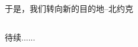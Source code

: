 ﻿\documentclass[hyperref={bookmarks=true},xcolor=pdflatex,svgnames,table,compress]{beamer}
\begin{document}
\subsection{}
\begin{frame}
\begin{ztebox}
于是，我们转向新的目的地--北约克
\end{ztebox}
\end{frame}

\subsection{}
\begin{frame}
\begin{ztebox}
待续......
\end{ztebox}
\end{frame}
\end{document}
